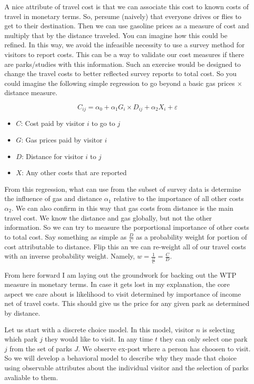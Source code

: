 \documentclass[
  letterpaper,
  DIV=11,
  numbers=noendperiod]{scrartcl}
\providecommand{\tightlist}{%
  \setlength{\itemsep}{0pt}\setlength{\parskip}{0pt}}\usepackage{longtable,booktabs,array}
\begin{document}
A nice attribute of travel cost is that we can associate this cost to
known costs of travel in monetary terms. So, persume (naively) that
everyone drives or flies to get to their destination. Then we can use
gasoline prices as a measure of cost and multiply that by the distance
traveled. You can imagine how this could be refined. In this way, we
avoid the infeasible necessity to use a survey method for visitors to
report costs. This can be a way to validate our cost measures if there
are parks/studies with this information. Such an exercise would be
designed to change the travel costs to better reflected survey reports
to total cost. So you could imagine the following simple regression to
go beyond a basic gas prices \(\times\) distance measure.

\[
C_{ij} = \alpha_0 + \alpha_1 G_{i} \times D_{ij} + \alpha_2 X_{i} + \varepsilon 
\]

\begin{itemize}
\tightlist
\item
  \(C\): Cost paid by visitor \(i\) to go to \(j\)
\item
  \(G\): Gas prices paid by visitor \(i\)
\item
  \(D\): Distance for visitor \(i\) to \(j\)
\item
  \(X\): Any other costs that are reported
\end{itemize}

From this regression, what can use from the subset of survey data is
determine the influence of gas and distance \(\alpha_1\) relative to the
importance of all other costs \(\alpha_2\). We can also confirm in this
way that gas costs from distance is the main travel cost. We know the
distance and gas globally, but not the other information. So we can try
to measure the porportional importance of other costs to total cost. Say
something as simple as \(\frac{D}{C}\) as a probability weight for
portion of cost attributable to distance. Flip this an we can re-weight
all of our travel costs with an inverse probability weight. Namely,
\(w = \frac{1}{\frac{D}{C}} = \frac{C}{D}\).

From here forward I am laying out the groundwork for backing out the WTP
measure in monetary terms. In case it gets lost in my explanation, the
core aspect we care about is likelihood to visit determined by
importance of income net of travel costs. This should give us the price
for any given park as determined by distance.

Let us start with a discrete choice model. In this model, visitor \(n\)
is selecting which park \(j\) they would like to visit. In any time
\(t\) they can only select one park \(j\) from the set of parks \(J\).
We observe ex-post where a person has choosen to visit. So we will
develop a behavioral model to describe why they made that choice using
observable attributes about the individual visitor and the selection of
parks avaliable to them.
\end{document}
